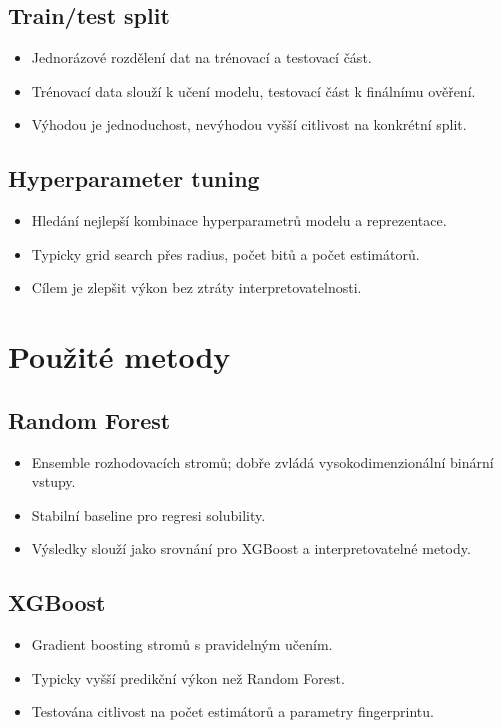 \documentclass[12pt]{article}
\begin{document}
\subsection{Train/test split}
\begin{itemize}
  \item Jednorázové rozdělení dat na trénovací a testovací část.
  \item Trénovací data slouží k učení modelu, testovací část k finálnímu ověření.
  \item Výhodou je jednoduchost, nevýhodou vyšší citlivost na konkrétní split.
\end{itemize}
\subsection{Hyperparameter tuning}
\begin{itemize}
  \item Hledání nejlepší kombinace hyperparametrů modelu a reprezentace.
  \item Typicky grid search přes radius, počet bitů a počet estimátorů.
  \item Cílem je zlepšit výkon bez ztráty interpretovatelnosti.
\end{itemize}

\section{Použité metody}
\subsection{Random Forest}
\begin{itemize}
  \item Ensemble rozhodovacích stromů; dobře zvládá vysokodimenzionální binární vstupy.
  \item Stabilní baseline pro regresi solubility.
  \item Výsledky slouží jako srovnání pro XGBoost a interpretovatelné metody.
\end{itemize}

\subsection{XGBoost}
\begin{itemize}
  \item Gradient boosting stromů s pravidelným učením.
  \item Typicky vyšší predikční výkon než Random Forest.
  \item Testována citlivost na počet estimátorů a parametry fingerprintu.
\end{itemize}
\end{document}
